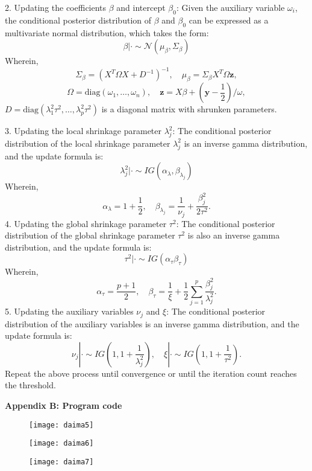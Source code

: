 \documentclass{mcmthesis}
\begin{document}
\begin{appendices}
2. Updating the coefficients $\beta$ and intercept $\beta_0$: Given the auxiliary variable $\omega_i$, the conditional posterior distribution of $\beta$ and $\beta_0$ can be expressed as a multivariate normal distribution, which takes the form:
$$
\beta | \cdot \sim \mathcal{N}(\mu_{\beta}, \Sigma_{\beta})
$$
Wherein,
$$
\Sigma_{\beta} = \left(X^T \Omega X + D^{-1}\right)^{-1},\quad \mu_{\beta} = \Sigma_{\beta} X^T \Omega \mathbf{z},
$$
$$
\Omega = \text{diag}(\omega_1, \ldots, \omega_n),\quad \mathbf{z} = X\beta + (\mathbf{y} - \frac{1}{2})/\omega,
$$
$D = \text{diag}(\lambda_1^2 \tau^2, \ldots, \lambda_p^2 \tau^2)$ is a diagonal matrix with shrunken parameters.

3. Updating the local shrinkage parameter $\lambda_j^2$: The conditional posterior distribution of the local shrinkage parameter $\lambda_j^2$ is an inverse gamma distribution, and the update formula is:
$$
\lambda_j^2 | \cdot \sim IG\left(\alpha_{\lambda}, \beta_{\lambda_j}\right)
$$
Wherein,
$$
\alpha_{\lambda} = 1 + \frac{1}{2}, \quad \beta_{\lambda_j} = \frac{1}{\nu_j} + \frac{\beta_j^2}{2 \tau^2}.
$$
4. Updating the global shrinkage parameter $\tau^2$: The conditional posterior distribution of the global shrinkage parameter $\tau^2$ is also an inverse gamma distribution, and the update formula is:
$$
\tau^2 | \cdot \sim IG\left(\alpha_{\tau} \beta_{\tau}\right)
$$
Wherein,
$$
\alpha_{\tau} = \frac{p + 1}{2},\quad \beta_{\tau} = \frac{1}{\xi} + \frac{1}{2} \sum_{j=1}^p \frac{\beta_j^2}{\lambda_j^2}.
$$
5. Updating the auxiliary variables $\nu_j$ and $\xi$: The conditional posterior distribution of the auxiliary variables is an inverse gamma distribution, and the update formula is:
$$
\nu_j | \cdot \sim IG\left(1, 1 + \frac{1}{\lambda_j^2}\right),\quad \xi | \cdot \sim IG\left(1, 1 + \frac{1}{\tau^2}\right).
$$
Repeat the above process until convergence or until the iteration count reaches the threshold.

\textbf{Appendix B: Program code}


\begin{figure}[ht]%
  \small
  \centering
  \texttt{[image: daima5]}
\end{figure}

\begin{figure}[ht]%
  \small
  \centering
  \texttt{[image: daima6]}
\end{figure}

\begin{figure}[t]%
  \small
  \centering
  \texttt{[image: daima7]}
\end{figure}

\end{appendices}
\end{document}
